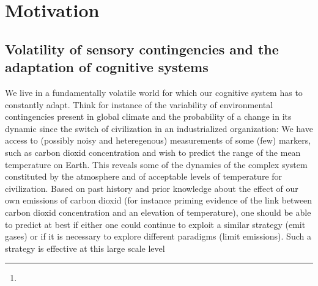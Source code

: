 \documentclass[profile,final,english, draft]{article}%
\title{\Title}%
\author{\AuthorA,
\AuthorB,
\AuthorC\thanks{\Address} }
\begin{document}
%
\maketitle%
\begin{abstract}
\Abstract
\end{abstract}
\section{Motivation}
\subsection{Volatility of sensory contingencies and
the adaptation of cognitive systems}
We live in a fundamentally volatile world for which
our cognitive system has to constantly adapt.
Think for instance of the variability of environmental contingencies
present in global climate and
the probability of a change in its dynamic
since the switch of civilization in an industrialized organization:
We have access to (possibly noisy and heteregenous) measurements
of some (few) markers, such as carbon dioxid concentration and
wish to predict the range of the mean temperature on Earth.
This reveals some of the dynamics of
the complex system constituted by the atmosphere
and of acceptable levels of temperature for civilization.
Based on past history and prior knowledge about
the effect of our own emissions of carbon dioxid
(for instance priming evidence of the link between carbon dioxid
concentration and an elevation of temperature),
one should be able to predict at best if either
one could continue to exploit a similar strategy (emit gases)
or if it is necessary to explore different paradigms (limit emissions).
Such a strategy is effective at this large scale level
\end{document}

